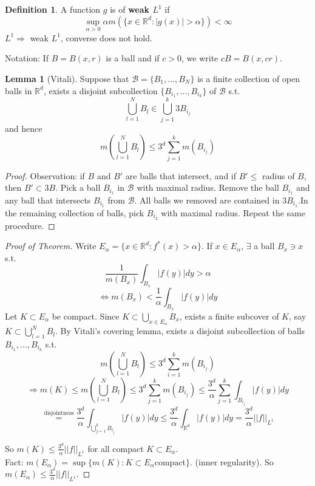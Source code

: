 \documentclass{article}
\theoremstyle{definition}
\newtheorem{lem}{Lemma}
\newtheorem{dfn}{Definition}
\begin{document}
    \begin{dfn}
		A function $g$ is of \textbf{weak $L^1$} if 
      $$\sup_{\alpha > 0} \alpha m(\{x \in \mathbb{R}^d : |g(x)| > \alpha\}) < \infty$$
      $L^1 \Rightarrow $ weak $L^1$, converse does not hold. 
    \end{dfn}
Notation: If $B = B(x, r)$ is a ball and if $c>0$, we write $cB = B(x, cr)$. 
\begin{lem}[Vitali]
  Suppose that $\mathcal{B} = \{B_1, ..., B_N\}$ is a finite collection of open balls in $\mathbb{R}^d$, exists a disjoint subcollection $\{B_{i_1}, ..., B_{i_k}\}$ of $\mathcal{B}$ s.t. 
  $$\bigcup_{l = 1}^N B_l \in \bigcup_{j = 1}^k 3 B_{i_j}$$
  and hence 
  $$m(\bigcup_{l = 1}^N B_l) \leq 3^d \sum_{j = 1}^k m(B_{i_j})$$
\end{lem}
\begin{proof}
  Observation: if $B$ and $B'$ are balls that intersect, and if $B' \leq $ radius of $B$, then $B' \subset 3B$. Pick a ball $B_{i_1}$ in $\mathcal{B}$ with maximal radius. Remove the ball $B_{i_1}$ and any ball that intersects $B_{i_1}$ from $\mathcal{B}$. All balls we removed are contained in $3B_{i_1}$.In the remaining collection of balls, pick $B_{i_2}$ with maximal radius. Repeat the same procedure.   
\end{proof}
\begin{proof}[Proof of Theorem] 
  Write $E_\alpha = \{x \in \mathbb{R}^d: f^*(x) > \alpha\}$. If $x \in E_{\alpha}$, $\exists$ a ball $B_x \ni x$ s.t. 
  $$\frac{1}{m(B_x)} \int_{B_x} |f(y)| dy > \alpha$$
  $$\Leftrightarrow m(B_x) < \frac{1}{\alpha} \int_{B_x} |f(y)| dy$$
  Let $K \subset E_{\alpha}$ be compact. Since $K \subset \bigcup_{x \in E_{\alpha}}B_x$, exists a finite subcover of $K$, say $K \subset \bigcup_{l = 1}^N B_l$. By Vitali's covering lemma, exists a disjoint subcollection of balls $B_{i_1}, ..., B_{i_k}$ s.t. 
  $$m(\bigcup_{l = 1}^N B_l) \leq 3^d \sum_{i = 1}^k m(B_{i_j})$$
  $$ \Rightarrow m(K) \leq m(\bigcup_{l =1}^N B_l)  \leq 3^d \sum_{j = 1}^{k} m(B_{i_j}) \leq \frac{3^d}{\alpha} \sum_{j = 1}^k \int_{B_{i_j}} |f(y)| dy$$ 
  $$\stackrel{\text{disjointness}}{=} \frac{3^d}{\alpha} \int_{\bigcup_{j = 1}^{k} B_{i_j}} |f(y)| dy \leq \frac{3^d}{\alpha} \int_{\mathbb{R}^d} |f(y)| dy = \frac{3^d}{\alpha} ||f||_{L^1} $$
  
  So $m(K) \leq \frac{3^d}{\alpha} ||f||_{L^1}$ for all compact $K \subset E_{\alpha}$. \\
  Fact: $m(E_{\alpha}) = \sup \{m(K):K\subset E_{\alpha}  \text{compact} \}$. (inner regularity). So $m(E_\alpha) \leq \frac{3^d}{\alpha} ||f||_{L^1}$. 
\end{proof}
\end{document}
